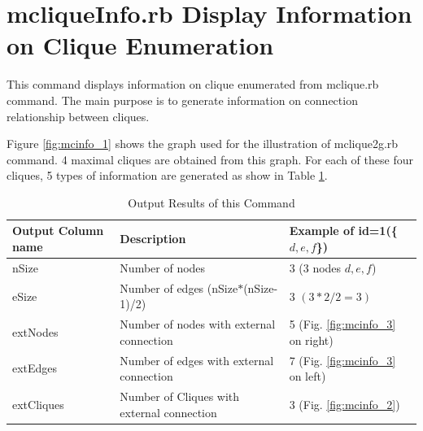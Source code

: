 
\section{mcliqueInfo.rb Display Information on Clique Enumeration \label{sect:mcliqueInfo}}

This command displays information on clique enumerated from mclique.rb command. The main purpose is to generate information on connection relationship between cliques. 

Figure \ref{fig:mcinfo_1} shows the graph used for the illustration of mclique2g.rb command. 4 maximal cliques are obtained from this graph. For each of these four cliques, 5 types of information are generated as show in Table \ref{tbl:mcinfo_1}. 

\begin{table}[htbp]
\begin{center}
\caption{Output Results of this Command\label{tbl:mcinfo_1}}
\begin{tabular}{lll}
\hline
Output Column name&Description& Example of id=1(\{$d,e,f$\}) \\
\hline
nSize      & Number of nodes                    & 3 (3 nodes $d,e,f$)\\
eSize      & Number of edges (nSize$*$(nSize-1)/2) & 3 $(3*2/2=3)$\\
extNodes   & Number of nodes with external connection            & 5 (Fig. \ref{fig:mcinfo_3} on right) \\
extEdges   & Number of edges with external connection              & 7 (Fig. \ref{fig:mcinfo_3} on left) \\
extCliques & Number of Cliques with external connection        & 3 (Fig. \ref{fig:mcinfo_2}) \\
\hline
\end{tabular} 
\end{center}
\end{table}


